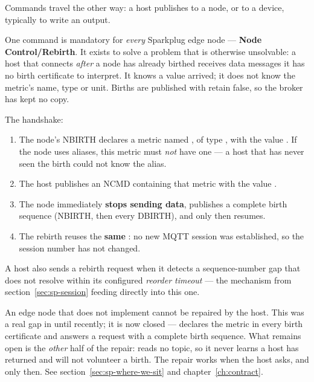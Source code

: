 Commands travel the other way: a host publishes  to a node, or  to a
device, typically to write an output.

One command is mandatory for \emph{every} Sparkplug edge node --- \textbf{Node
Control/Rebirth}. It exists to solve a problem that is otherwise unsolvable: a host that
connects \emph{after} a node has already birthed receives data messages it has no birth
certificate to interpret. It knows a value arrived; it does not know the metric's name,
type or unit. Births are published with retain false, so the broker has kept no copy.

The handshake:

\begin{enumerate}
  \item The node's NBIRTH declares a metric named , of type
        , with the value . If the node uses aliases, this metric
        must \emph{not} have one --- a host that has never seen the birth could not know
        the alias.
  \item The host publishes an NCMD containing that metric with the value .
  \item The node immediately \textbf{stops sending data}, publishes a complete birth
        sequence (NBIRTH, then every DBIRTH), and only then resumes.
  \item The rebirth reuses the \textbf{same} : no new MQTT session was
        established, so the session number has not changed.
\end{enumerate}

A host also sends a rebirth request when it detects a sequence-number gap that does not
resolve within its configured \emph{reorder timeout} --- the mechanism from
section~\ref{sec:sp-session} feeding directly into this one.

\begin{warning}
An edge node that does not implement  cannot be repaired by the
host. This was a real gap in \prog until recently; it is now closed --- \prog declares the
metric in every birth certificate and answers a request with a complete birth sequence.
What remains open is the \emph{other} half of the repair: \prog reads no 
topic, so it never learns a host has returned and will not volunteer a birth. The repair
works when the host asks, and only then. See section~\ref{sec:sp-where-we-sit} and
chapter~\ref{ch:contract}.
\end{warning}

